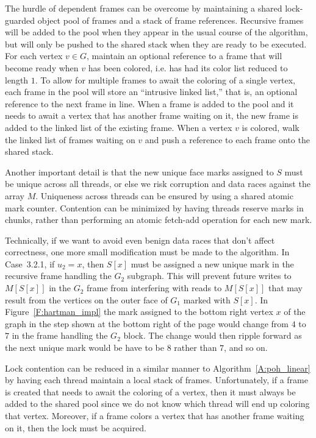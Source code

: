 \documentclass[12pt,letterpaper]{article}
\theoremstyle{plain}
\theoremstyle{definition}
\theoremstyle{break}
\begin{document}
The hurdle of dependent frames can be overcome by maintaining a shared
lock-guarded object pool
of frames and a stack of frame references. Recursive frames will be added to the
pool when they appear in the usual course of the algorithm, but will
only be pushed to the shared stack when they are ready to be
executed. For each vertex $v\in G$, maintain an optional reference
to a frame that will become ready when $v$ has been colored, i.e. has had
its color list reduced to length $1$. To allow for
multiple frames to await the coloring of a single vertex, each frame in the
pool will store an ``intrusive linked list,'' that is, an optional
reference to the next frame in line. When a frame is added to the pool and
it needs to await a vertex that has another frame waiting on it,
the new frame is added to the linked list of the existing frame.
When a vertex $v$ is colored, 
walk the linked list of frames waiting on $v$
and push a reference to each frame onto the shared stack.

Another important detail
is that the new unique face marks assigned to $S$ must be unique
across all threads, or else we risk corruption and data races against
the array $M$.
Uniqueness across threads can be ensured by using a shared atomic mark
counter.
Contention can be minimized by having
threads reserve marks in chunks, rather than performing an
atomic fetch-add operation for each new mark.

Technically, if we want to avoid even benign data races that don't affect
correctness, one more small
modification must be made to the algorithm.
In Case~3.2.1, if $u_2= x$, then $S[x]$ must be assigned a new unique mark
in the recursive frame handling the $G_2$ subgraph. This will
prevent future writes to $M[S[x]]$ in the $G_2$ frame from
interfering with reads to $M[S[x]]$ that may result from the vertices on the
outer face of $G_1$ marked with $S[x]$. In
Figure~\ref{F:hartman_impl} the mark assigned to the bottom
right vertex $x$ of the graph in the step shown at the bottom right of the
page would change from $4$ to $7$ in the frame handling the $G_2$ block.
The change would then ripple forward as the next unique mark
would be have to be $8$ rather than $7$, and so on.

Lock contention can be reduced in a similar manner to
Algorithm~\ref{A:poh_linear} by having each thread maintain a local stack of
frames. Unfortunately, if a frame is created that needs to await the coloring
of a vertex, then it must always be added to the shared pool since we do not
know which thread will end up coloring that vertex.
Moreover, if a frame colors a
vertex that has another frame waiting on it, then the lock must be
acquired.
\end{document}
